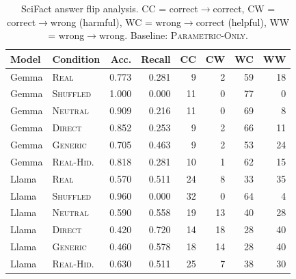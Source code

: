 \begin{table}[t]
\centering
\caption{SciFact answer flip analysis. CC = correct$\to$correct, CW = correct$\to$wrong (harmful), WC = wrong$\to$correct (helpful), WW = wrong$\to$wrong. Baseline: \textsc{Parametric-Only}.}
\label{tab:flips}
\small
\begin{tabular}{llrrrrrr}
\toprule
Model & Condition & Acc. & Recall & CC & CW & WC & WW \\
\midrule
Gemma & \textsc{Real} & 0.773 & 0.281 & 9 & 2 & 59 & 18 \\
Gemma & \textsc{Shuffled} & 1.000 & 0.000 & 11 & 0 & 77 & 0 \\
Gemma & \textsc{Neutral} & 0.909 & 0.216 & 11 & 0 & 69 & 8 \\
Gemma & \textsc{Direct} & 0.852 & 0.253 & 9 & 2 & 66 & 11 \\
Gemma & \textsc{Generic} & 0.705 & 0.463 & 9 & 2 & 53 & 24 \\
Gemma & \textsc{Real-Hid.} & 0.818 & 0.281 & 10 & 1 & 62 & 15 \\
Llama & \textsc{Real} & 0.570 & 0.511 & 24 & 8 & 33 & 35 \\
Llama & \textsc{Shuffled} & 0.960 & 0.000 & 32 & 0 & 64 & 4 \\
Llama & \textsc{Neutral} & 0.590 & 0.558 & 19 & 13 & 40 & 28 \\
Llama & \textsc{Direct} & 0.420 & 0.720 & 14 & 18 & 28 & 40 \\
Llama & \textsc{Generic} & 0.460 & 0.578 & 18 & 14 & 28 & 40 \\
Llama & \textsc{Real-Hid.} & 0.630 & 0.511 & 25 & 7 & 38 & 30 \\
\bottomrule
\end{tabular}
\end{table}